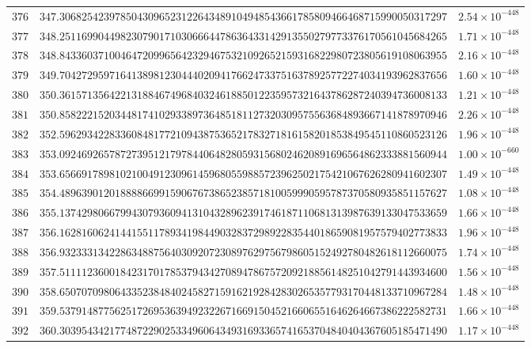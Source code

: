 \documentclass[12pt,reqno]{amsart}
\theoremstyle{remark}
\begin{document}
\begin{longtable}{clc}
$376$ & $347.3068254239785043096523122643489104948543661785809466468715990050317297$ & $2.54\times 10^{-448}$ \\
$377$ & $348.2511699044982307901710306664478636433142913550279773376170561045684265$ & $1.71\times 10^{-448}$ \\
$378$ & $348.8433603710046472099656423294675321092652159316822980723805619108063955$ & $2.16\times 10^{-448}$ \\
$379$ & $349.7042729597164138981230444020941766247337516378925772274034193962837656$ & $1.60\times 10^{-448}$ \\
$380$ & $350.3615713564221318846749684032461885012235957321643786287240394736008133$ & $1.21\times 10^{-448}$ \\
$381$ & $350.8582221520344817410293389736485181127320309575563684893667141878970946$ & $2.26\times 10^{-448}$ \\
$382$ & $352.5962934228336084817721094387536521783271816158201853849545110860523126$ & $1.96\times 10^{-448}$ \\
$383$ & $353.0924692657872739512179784406482805931568024620891696564862333881560944$ & $1.00\times 10^{-660}$ \\
$384$ & $353.6566917898102100491230961459680559885723962502175421067626280941602307$ & $1.49\times 10^{-448}$ \\
$385$ & $354.4896390120188886699159067673865238571810059990595787370580935851157627$ & $1.08\times 10^{-448}$ \\
$386$ & $355.1374298066799430793609413104328962391746187110681313987639133047533659$ & $1.66\times 10^{-448}$ \\
$387$ & $356.1628160624144155117893419844903283729892283544018659081957579402773833$ & $1.96\times 10^{-448}$ \\
$388$ & $356.9323331342286348875640309207230897629756798605152492780482618112660075$ & $1.74\times 10^{-448}$ \\
$389$ & $357.5111123600184231701785379434270894786757209218856148251042791443934600$ & $1.56\times 10^{-448}$ \\
$390$ & $358.6507070980643352384840245827159162192842830265357793170448133710967284$ & $1.48\times 10^{-448}$ \\
$391$ & $359.5379148775625172695363949232267166915045216606551646264667386222582731$ & $1.66\times 10^{-448}$ \\
$392$ & $360.3039543421774872290253349606434931693365741653704840404367605185471490$ & $1.17\times 10^{-448}$ \\

\end{longtable}
\end{document}
